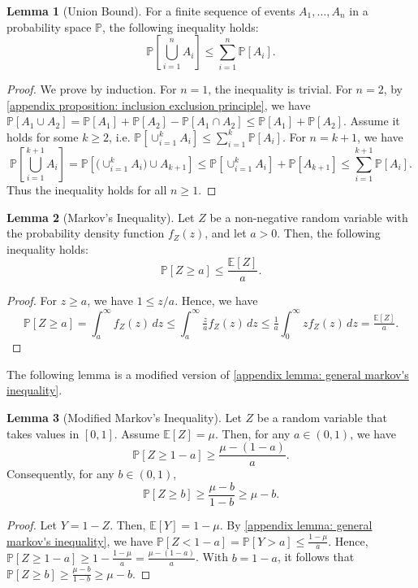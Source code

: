 \documentclass[openany, amssymb, psamsfonts]{amsart}
\theoremstyle{definition}
\numberwithin{equation}{section}
\newtheorem{appendixlemma}{Lemma}
\begin{document}
\begin{appendixlemma}[Union Bound]\label{appendix lemma: union bound}
For a finite sequence of events $A_1, \dots, A_n$ in a probability space $\mathbb{P}$, the following inequality holds:
\[\mathbb{P}\left[ \bigcup_{i=1}^{n} A_i \right] \leq \sum_{i=1}^{n} \mathbb{P}[A_i].\]
\end{appendixlemma}

\begin{proof}
We prove by induction. For $n=1$, the inequality is trivial. For $n=2$, by \autoref{appendix proposition: inclusion exclusion principle}, we have $\mathbb{P}[A_1 \cup A_2] = \mathbb{P}[A_1]+\mathbb{P}[A_2]-\mathbb{P}[A_1 \cap A_2] \leq \mathbb{P}[A_1]+\mathbb{P}[A_2]$. Assume it holds for some $k\ge2$, i.e. $\mathbb{P}[\cup_{i=1}^k A_i] \le \sum_{i=1}^k \mathbb{P}[A_i]$. For $n=k+1$, we have
\[
\mathbb{P}\!\left[\bigcup_{i=1}^{k+1} A_i\right] 
= \mathbb{P}\!\left[\big(\cup_{i=1}^k A_i\big)\cup A_{k+1}\right] 
\le \mathbb{P}\!\left[\cup_{i=1}^k A_i\right]+\mathbb{P}[A_{k+1}] 
\le \sum_{i=1}^{k+1}\mathbb{P}[A_i].
\]
Thus the inequality holds for all $n\ge1$.
\end{proof}

\begin{appendixlemma}[Markov's Inequality]\label{appendix lemma: general markov's inequality}
Let $Z$ be a non-negative random variable with the probability density function $f_Z(z)$, and let $a > 0$. Then, the following inequality holds:
\[\mathbb{P}[Z \geq a] \leq \frac{\mathbb{E}[Z]}{a}.\]
\end{appendixlemma}
\begin{proof}
For $z \ge a$, we have $1 \le z/a$. Hence, we have
\[\mathbb{P}[Z \ge a]
= \int_a^\infty f_Z(z)\,dz
\le \int_a^\infty \tfrac{z}{a} f_Z(z)\,dz
\le \tfrac{1}{a}\int_0^\infty z f_Z(z)\,dz
= \tfrac{\mathbb{E}[Z]}{a}.\]
\end{proof}

The following lemma is a modified version of \autoref{appendix lemma: general markov's inequality}.
\begin{appendixlemma}[Modified Markov's Inequality]\label{appendix lemma: modified markov's inequality}
Let $Z$ be a random variable that takes values in $[0,1]$. Assume $\mathbb{E}[Z] = \mu$. Then, for any $a \in (0,1)$, we have
\[\mathbb{P}[Z \geq 1 - a] \geq \frac{\mu - (1 - a)}{a}.\]
Consequently, for any $b \in (0,1)$,
\[\mathbb{P}[Z \geq b] \geq \frac{\mu - b}{1 - b} \geq \mu - b.\]
\end{appendixlemma}
\begin{proof}
Let $Y = 1 - Z$. Then, $\mathbb{E}[Y] = 1 - \mu$. By \autoref{appendix lemma: general markov's inequality}, we have 
$\mathbb{P}[Z < 1 - a] = \mathbb{P}[Y > a] \le \tfrac{1 - \mu}{a}$.  
Hence, $\mathbb{P}[Z \ge 1 - a] \ge 1 - \tfrac{1 - \mu}{a} = \tfrac{\mu - (1 - a)}{a}$.  
With $b = 1 - a$, it follows that $\mathbb{P}[Z \ge b] \ge \tfrac{\mu - b}{1 - b} \ge \mu - b$.
\end{proof}
\end{document}

